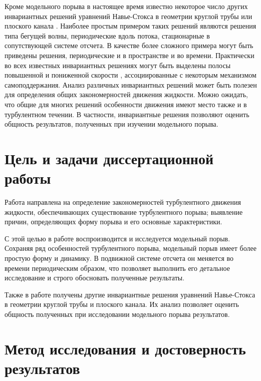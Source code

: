 Кроме модельного порыва в настоящее время известно некоторое число других инвариантных решений уравнений Навье-Стокса в геометрии круглой трубы или плоского канала \cite{Kawahara2012}. Наиболее простым примером таких решений являются решения типа бегущей волны, периодические вдоль потока, стационарные в сопутствующей системе отсчета. В качестве более сложного примера могут быть приведены решения, периодические и в пространстве и во времени. Практически во всех известных инвариантных решениях могут быть выделены полосы повышенной и пониженной скорости  \cite{Kawahara2012}, ассоциированные с некоторым механизмом самоподдержания. Анализ различных инвариантных решений может быть полезен для определения общих закономерностей движения жидкости. Можно ожидать, что общие для многих решений особенности движения имеют место также и в турбулентном течении. В частности, инвариантные решения позволяют оценить общность результатов, полученных при изучении модельного порыва. 


\section{Цель и задачи диссертационной работы}

Работа направлена на определение закономерностей турбулентного движения жидкости, обеспечивающих существование турбулентного порыва; выявление причин, определяющих форму порыва и его основные характеристики. 

С этой целью в работе воспроизводится и исследуется модельный порыв. Сохраняя ряд особенностей турбулентного порыва, модельный порыв имеет более простую форму и динамику. В подвижной системе отсчета он меняется во времени периодическим образом, что позволяет выполнить его детальное исследование и строго обосновать полученные результаты. 

Также в работе получены другие инвариантные решения уравнений Навье-Стокса в геометрии круглой трубы и плоского канала. Их анализ позволяет оценить общность полученных при исследовании модельного порыва результатов. 


\section{Метод исследования и достоверность результатов}

